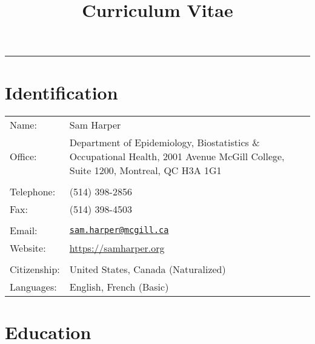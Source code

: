 \documentclass[
  letterpaper,
  DIV=11,
  numbers=noendperiod]{scrartcl}
\title{Curriculum Vitae}
\author{}
\date{}
\begin{document}
\maketitle
\ifdefined\Shaded\renewenvironment{Shaded}{\begin{tcolorbox}[boxrule=0pt, interior hidden, breakable, enhanced, borderline west={3pt}{0pt}{shadecolor}, frame hidden, sharp corners]}{\end{tcolorbox}}\fi

\begin{center}\rule{0.5\linewidth}{0.5pt}\end{center}

\hypertarget{identification}{%
\section{Identification}\label{identification}}

\begin{longtable}[]{@{}
  >{\raggedright\arraybackslash}p{}
  >{\raggedright\arraybackslash}p{}@{}}
\toprule\noalign{}
\endhead
\bottomrule\noalign{}
\endlastfoot
Name: & Sam Harper \\
Office: & Department of Epidemiology, Biostatistics \& Occupational
Health, 2001 Avenue McGill College, Suite 1200, Montreal, QC H3A 1G1 \\
& \\
Telephone: & (514) 398-2856 \\
Fax: & (514) 398-4503 \\
& \\
Email: &
\href{mailto:sam.harper@mcgill.ca}{\nolinkurl{sam.harper@mcgill.ca}} \\
Website: & \url{https://samharper.org} \\
& \\
Citizenship: & United States, Canada (Naturalized) \\
Languages: & English, French (Basic) \\
\end{longtable}

\hypertarget{education}{%
\section{Education}\label{education}}
\end{document}
